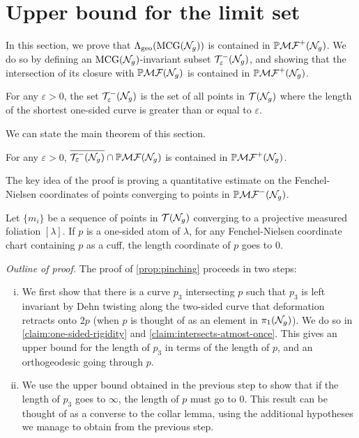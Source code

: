 \section{Upper bound for the limit set}
\label{sec:upper-bound-limit-set}

In this section, we prove that $\Lambda_{\mathrm{geo}}(\mathrm{MCG}(\mathcal{N}_g))$ is contained in $\mathbb{P}\mathcal{MF}^+(\mathcal{N}_g)$.
We do so by defining an $\mathrm{MCG}(\mathcal{N}_g)$-invariant subset $\mathcal{T}_{\varepsilon}^{-}(\mathcal{N}_g)$, and showing that the intersection of its closure with $\mathbb{P}\mathcal{MF}(\mathcal{N}_g)$ is contained in $\mathbb{P}\mathcal{MF}^+(\mathcal{N}_g)$.

\begin{definition}
  For any $\varepsilon > 0$, the set $\mathcal{T}_{\varepsilon}^{-}(\mathcal{N}_g)$ is the set of all points in $\mathcal{T}(\mathcal{N}_g)$ where the length of the shortest one-sided curve is greater than or equal to $\varepsilon$.
\end{definition}

We can state the main theorem of this section.
\begin{theorem}
  \label{thm:systole-closure}
  For any $\varepsilon > 0$, $\overline{\mathcal{T}_{\varepsilon}^{-}(\mathcal{N}_g)} \cap \mathbb{P}\mathcal{MF}(\mathcal{N}_g)$ is contained in $\mathbb{P}\mathcal{MF}^+(\mathcal{N}_g)$.
\end{theorem}
The key idea of the proof is proving a quantitative estimate on the Fenchel-Nielsen coordinates of points converging to points in $\mathbb{P}\mathcal{MF}^-(\mathcal{N}_g)$.
\begin{proposition}
  \label{prop:pinching}
  Let $\{m_i\}$ be a sequence of points in $\mathcal{T}(\mathcal{N}_g)$ converging to a projective measured foliation $[\lambda]$.
  If $p$ is a one-sided atom of $\lambda$, for any Fenchel-Nielsen coordinate chart containing $p$ as a cuff, the length coordinate of $p$ goes to $0$.
\end{proposition}

\textit{Outline of proof.} The proof of \autoref{prop:pinching} proceeds in two steps:
\begin{enumerate}[(i)]
\item We first show that there is a curve $p_3$ intersecting $p$ such that $p_3$ is left invariant by Dehn twisting along the two-sided curve that deformation retracts onto $2p$ (when $p$ is thought of as an element in $\pi_1(\mathcal{N}_g)$).
  We do so in  \autoref{claim:one-sided-rigidity} and \autoref{claim:intersects-atmost-once}.
  This gives an upper bound for the length of $p_3$ in terms of the length of $p$, and an orthogeodesic going through $p$.
\item We use the upper bound obtained in the previous step to show that if the length of $p_3$ goes to $\infty$, the length of $p$ must go to $0$.
  This result can be thought of as a converse to the collar lemma, using the additional hypotheses we manage to obtain from the previous step.
\end{enumerate}

